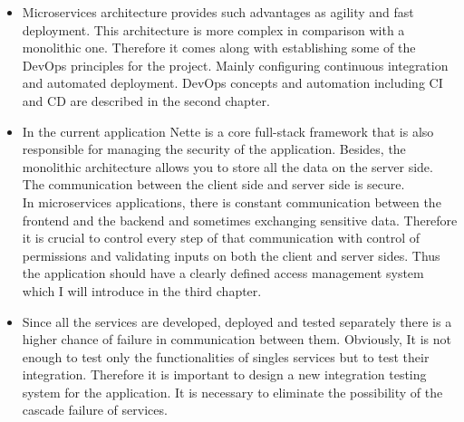 \begin{itemize}
    \item Microservices architecture provides such advantages as agility and fast deployment. This architecture is more complex in comparison with a monolithic one. Therefore it comes along with establishing some of the DevOps principles for the project. Mainly configuring continuous integration and automated deployment. DevOps concepts and automation including CI and CD are described in the second chapter.
    \item In the current application Nette is a core full-stack framework that is also responsible for managing the security of the application. Besides, the monolithic architecture allows you to store all the data on the server side. The communication between the client side and server side is secure.\\
    In microservices applications, there is constant communication between the frontend and the backend and sometimes exchanging sensitive data. Therefore it is crucial to control every step of that communication with control of permissions and validating inputs on both the client and server sides. Thus the application should have a clearly defined access management system which I will introduce in the third chapter.
    \item Since all the services are developed, deployed and tested separately there is a higher chance of failure in communication between them. Obviously, It is not enough to test only the functionalities of singles services but to test their integration. Therefore it is important to design a new integration testing system for the application. It is necessary to eliminate the possibility of the cascade failure of services.
\end{itemize}
